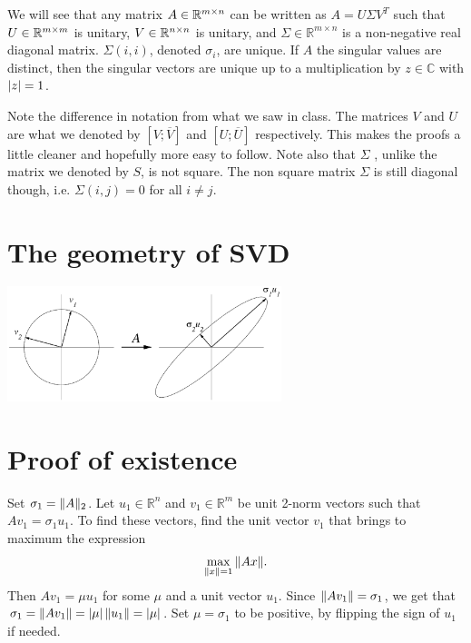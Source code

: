 \documentclass{article}
\begin{document}



We will see that any
matrix $A \in {\mathbb{R}}^{m \times n}$ can be written as $A=U\Sigma V^{T}$ such that 
$U \in \mathbb{{\mathbb{R}}}^{m \times m}$ is unitary, $V \in {\mathbb{R}}^{n \times n}$ is unitary, and $\Sigma \in \mathbb{R}^{m
\times n}$ is a non-negative real diagonal matrix.
$\Sigma(i,i)$, denoted $\sigma_{i}$, are unique. If $A$ the singular values are distinct, then the singular vectors are
unique up to a multiplication by $z\in\mathbb{C}$ with $\left| z \right|=1$.


\begin{remark}
Note the difference in notation from what we saw in class. 
The matrices $V$ and $U$ are what we denoted by $[V ; \overline{V}]$ 
and $[U ; \overline{U}]$ respectively. This makes the proofs a little cleaner
and hopefully more easy to follow. Note also that $\Sigma$ , unlike the matrix we denoted by $S$,
is not square. The non square matrix $\Sigma$ is still diagonal though, i.e. $\Sigma(i,j) = 0$ for all $i \ne j$. 
\end{remark}


\section{The geometry of SVD}
\begin{center}
\includegraphics[width=0.6\textwidth]{images/SVDgeometry.eps}
\end{center}

\section{Proof of existence}
Set $\sigma_{1}=\| A \|_{2}$. Let $u_{1}\in \mathbb{R}^{n}$ and
$v_{1}\in\mathbb{R}^{m}$ be unit 2-norm vectors such that $Av_{1} =
\sigma_{1}u_{1}$. To find these vectors, find the unit vector
$v_{1}$ that brings to maximum the expression
\begin{equation*}
\max_{\| x \|=1} \| Ax \|.
\end{equation*}
Then $A v_{1}=\mu u_{1}$ for some $\mu$ and a unit vector $u_{1}$.
Since $\| A v_{1} \| = \sigma_{1}$, we get that $\sigma_{1} =
\| A v_{1} \| = \left| \mu \right| \| u_{1} \| = \left| \mu \right|$. Set $\mu =
\sigma_{1}$ to be positive, by flipping the sign of $u_{1}$ if
needed.
\end{document}

